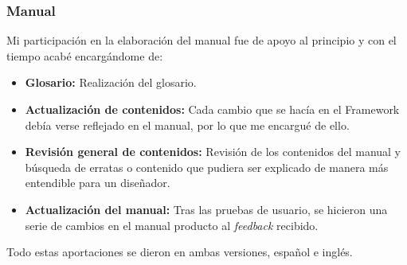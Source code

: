 \subsubsection{Manual}
Mi participación en la elaboración del manual fue de apoyo al principio y con el tiempo acabé encargándome de:
\begin{itemize}
	\item \textbf{Glosario:} Realización del glosario.
	\item \textbf{Actualización de contenidos:} Cada cambio que se hacía en el Framework debía verse reflejado en el manual, por lo que me encargué de ello.
	\item \textbf{Revisión general de contenidos:} Revisión de los contenidos del manual y búsqueda de erratas o contenido que pudiera ser explicado de manera más entendible para un diseñador.
	\item \textbf{Actualización del manual:} Tras las pruebas de usuario, se hicieron una serie de cambios en el manual producto al \textit{feedback} recibido.
\end{itemize}

Todo estas aportaciones se dieron en ambas versiones, español e inglés.